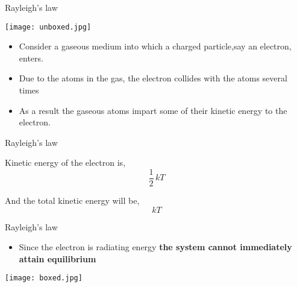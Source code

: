 \documentclass[aspectratio=169]{beamer}
\begin{document}
\begin{frame}{Rayleigh's law}

	\begin{multicols}{2}
	
	
		\texttt{[image: unboxed.jpg]} \pause
	 
 
		\columnbreak
		
		\begin{itemize}
		
			\item Consider a gaseous medium into which a charged particle,say an electron, enters. \pause \newline
			\item Due to the atoms in the gas, the electron collides with the atoms several times \pause \newline
			\item As a result the gaseous atoms impart some of their kinetic energy to the electron.
		
		\end{itemize}

	
	\end{multicols}
		

\end{frame}

\begin{frame}{Rayleigh's law}
	
 	\begin{center}
 				
		{\large Kinetic energy of the electron is,} 
		\[ \frac{1}{2}\,kT \]
		
		{\large And the total kinetic energy will be,}
		\[ kT \]
		
	\end{center}
		
\end{frame}
	
\begin{frame}{Rayleigh's law}

	 	
		\begin{multicols}{2}
  			\begin{itemize}
  				\item {\large Since the electron is radiating energy \textbf{the system cannot immediately attain equilibrium}} \pause
  			\end{itemize}
  				
	\columnbreak
	
			\texttt{[image: boxed.jpg]}
			
		\end{multicols}
		

	
\end{frame}
	
\end{document}
